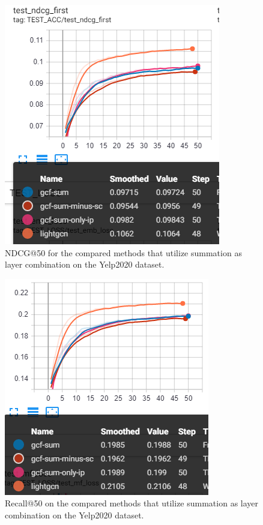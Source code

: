 \begin{figure}[h!]
    \includegraphics[width=\linewidth]{figures/gcf-sum-ndcg.png}
    \caption{NDCG@50 for the compared methods that utilize summation as layer combination on the Yelp2020 dataset.}
    \label{fig:GCF-sum-NDCG-ablation-study}
\end{figure}
\begin{figure}[h!]
    \includegraphics[width=\linewidth]{figures/gcf-sum-recall.png}
    \caption{Recall@50 on the compared methods that utilize summation as layer combination on the Yelp2020 dataset.}
    \label{fig:GCF-sum-recall-ablation-study}
\end{figure}
